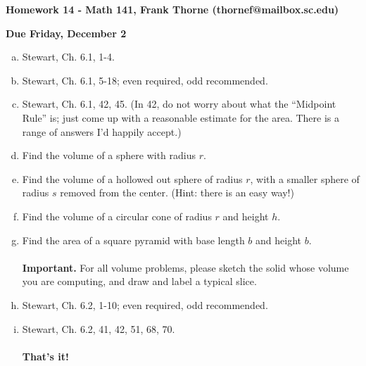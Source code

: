 \documentclass[12pt]{article}
\begin{document}
\setlength{\topmargin}{-2mm}





\begin{center}{\bf Homework 14 - Math 141, Frank Thorne (thornef@mailbox.sc.edu)}
\end{center}
\begin{center}
{\bf Due Friday, December 2}
\end{center}

\begin{enumerate}[(a)]
\item
Stewart, Ch. 6.1, 1-4.

\item
Stewart, Ch. 6.1, 5-18; even required, odd recommended.

\item
Stewart, Ch. 6.1, 42, 45. (In 42, do not worry about what the ``Midpoint Rule'' is;
just come up with a reasonable estimate for the area. There is a range of answers
I'd happily accept.)

\item
Find the volume of a sphere with radius $r$.

\item
Find the volume of a hollowed out sphere of radius $r$, with a smaller sphere
of radius $s$ removed from the center. (Hint: there is an easy way!)

\item
Find the volume of a circular cone of radius $r$ and height $h$.

\item
Find the area of a square pyramid with base length $b$ and height $b$.
\\
\\
{\bf Important.} For all volume problems, please sketch the solid whose volume
you are computing, and draw and label a typical slice.
\item
Stewart, Ch. 6.2, 1-10; even required, odd recommended.

\item
Stewart, Ch. 6.2, 41, 42, 51, 68, 70.
\\
\\
{\bf That's it!}
\end{enumerate}
\end{document}
